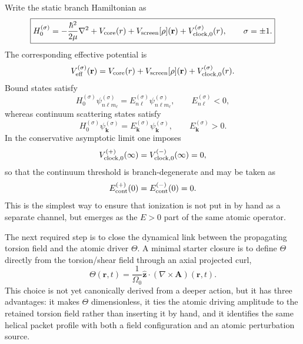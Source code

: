 \documentclass[11pt,a4paper]{article}
\begin{document}
Write the static branch Hamiltonian as
\begin{equation}
\label{eq:H0sigma}
\boxed{
H_0^{(\sigma)}
=
-\frac{\hbar^2}{2\mu}\nabla^2
+
V_{\rm core}(r)
+
V_{\rm screen}[\rho](\mathbf r)
+
V_{{\rm clock},0}^{(\sigma)}(r),
\qquad
\sigma=\pm 1.
}
\end{equation}
The corresponding effective potential is
\begin{equation}
\label{eq:Veffsigma}
V_{\rm eff}^{(\sigma)}(\mathbf r)
=
V_{\rm core}(r)
+
V_{\rm screen}[\rho](\mathbf r)
+
V_{{\rm clock},0}^{(\sigma)}(r).
\end{equation}
Bound states satisfy
\begin{equation}
\label{eq:boundstates}
H_0^{(\sigma)}\psi_{n\ell m_\ell}^{(\sigma)}
=
E_{n\ell}^{(\sigma)}\psi_{n\ell m_\ell}^{(\sigma)},
\qquad
E_{n\ell}^{(\sigma)}<0,
\end{equation}
whereas continuum scattering states satisfy
\begin{equation}
\label{eq:continuumstates}
H_0^{(\sigma)}\psi_{\mathbf k}^{(\sigma)}
=
E_{\mathbf k}^{(\sigma)}\psi_{\mathbf k}^{(\sigma)},
\qquad
E_{\mathbf k}^{(\sigma)}>0.
\end{equation}
In the conservative asymptotic limit one imposes
\begin{equation}
\label{eq:clock-asymptotic}
V_{{\rm clock},0}^{(+)}(\infty)=V_{{\rm clock},0}^{(-)}(\infty)=0,
\end{equation}
so that the continuum threshold is branch-degenerate and may be taken as
\begin{equation}
\label{eq:continuum-threshold}
E_{\rm cont}^{(+)}(0)=E_{\rm cont}^{(-)}(0)=0.
\end{equation}
This is the simplest way to ensure that ionization is not put in by hand as a separate channel, but emerges as the $E>0$ part of the same atomic operator.

The next required step is to close the dynamical link between the propagating torsion field and the atomic driver $\Theta$. A minimal starter closure is to define $\Theta$ directly from the torsion/shear field through an axial projected curl,
\begin{equation}
\label{eq:ThetaA}
\boxed{
\Theta(\mathbf r,t)
=
\frac{1}{\Omega_0}
\hat{\mathbf z}\cdot(\nabla\times \mathbf A)(\mathbf r,t).
}
\end{equation}
This choice is not yet canonically derived from a deeper action, but it has three advantages: it makes $\Theta$ dimensionless, it ties the atomic driving amplitude to the retained torsion field rather than inserting it by hand, and it identifies the same helical packet profile with both a field configuration and an atomic perturbation source.
\end{document}
